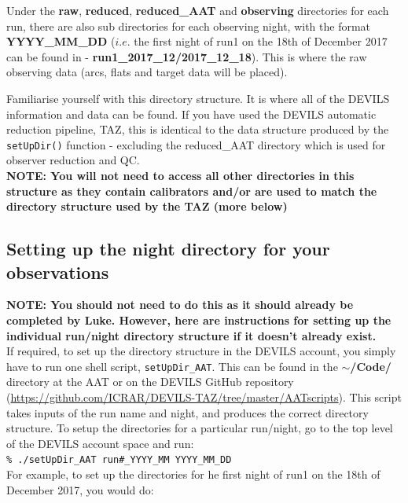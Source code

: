 \documentclass[12pt]{article}
\begin{document}
Under the \textbf{raw}, \textbf{reduced}, \textbf{reduced\_AAT} and \textbf{observing} directories for each run, there are also sub directories for each observing night, with the format \textbf{YYYY\_MM\_DD} ($i.e.$ the first night of run1 on the 18th of December 2017 can be found in - \textbf{run1\_2017\_12/2017\_12\_18}). This is where the raw observing data (arcs, flats and target data will be placed).

Familiarise yourself with this directory structure. It is where all of the DEVILS information and data can be found. If you have used the DEVILS automatic reduction pipeline, TAZ, this is identical to the data structure produced by the \texttt{setUpDir()} function - excluding the reduced\_AAT directory which is used for observer reduction and QC. \\

\textcolor{PineGreen}{\textbf{NOTE: You will not need to access all other directories in this structure as they contain calibrators and/or are used to match the directory structure used by the TAZ (more below)}}\\


\subsection{Setting up the night directory for your observations}

\textcolor{PineGreen}{\textbf{NOTE: You should not need to do this as it should already be completed by Luke. However, here are instructions for setting up the individual run/night directory structure if it doesn't already exist.}} \\

If required, to set up the directory structure in the DEVILS account, you simply have to run one shell script, \texttt{setUpDir\_AAT}. This can be found in the \textbf{$\sim$/Code/} directory at the AAT or on the DEVILS GitHub repository (\url{https://github.com/ICRAR/DEVILS-TAZ/tree/master/AATscripts}). This script  takes inputs of the run name and night, and produces the correct directory structure. To setup the directories for a particular run/night, go to the top level of the DEVILS account space and run:\\

\hspace{10mm} \texttt{\% ./setUpDir\_AAT run\#\_YYYY\_MM YYYY\_MM\_DD} \\

For example, to set up the directories for he first night of run1 on the 18th of December 2017, you would do: \\
\end{document}
